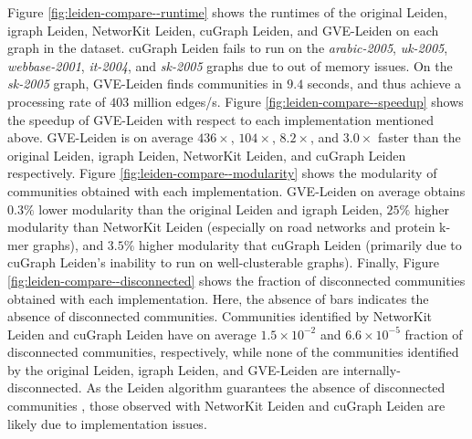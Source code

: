Figure \ref{fig:leiden-compare--runtime} shows the runtimes of the original Leiden, igraph Leiden, NetworKit Leiden, cuGraph Leiden, and GVE-Leiden on each graph in the dataset. cuGraph Leiden fails to run on the \textit{arabic-2005}, \textit{uk-2005}, \textit{webbase-2001}, \textit{it-2004}, and \textit{sk-2005} graphs due to out of memory issues. On the \textit{sk-2005} graph, GVE-Leiden finds communities in $9.4$ seconds, and thus achieve a processing rate of $403$ million edges/s. Figure \ref{fig:leiden-compare--speedup} shows the speedup of GVE-Leiden with respect to each implementation mentioned above. GVE-Leiden is on average $436\times$, $104\times$, $8.2\times$, and $3.0\times$ faster than the original Leiden, igraph Leiden, NetworKit Leiden, and cuGraph Leiden respectively. Figure \ref{fig:leiden-compare--modularity} shows the modularity of communities obtained with each implementation. GVE-Leiden on average obtains $0.3\%$ lower modularity than the original Leiden and igraph Leiden, $25\%$ higher modularity than NetworKit Leiden (especially on road networks and protein k-mer graphs), and $3.5\%$ higher modularity that cuGraph Leiden (primarily due to cuGraph Leiden's inability to run on well-clusterable graphs). Finally, Figure \ref{fig:leiden-compare--disconnected} shows the fraction of disconnected communities obtained with each implementation. Here, the absence of bars indicates the absence of disconnected communities. Communities identified by NetworKit Leiden and cuGraph Leiden have on average $1.5\times10^{-2}$ and $6.6\times10^{-5}$ fraction of disconnected communities, respectively, while none of the communities identified by the original Leiden, igraph Leiden, and GVE-Leiden are internally-disconnected. As the Leiden algorithm guarantees the absence of disconnected communities \cite{com-traag19}, those observed with NetworKit Leiden and cuGraph Leiden are likely due to implementation issues.


